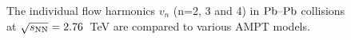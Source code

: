 \begin{figure}[h]
\begin{center}
        \caption{The individual flow harmonics $v_n$ (n=2, 3 and 4) in $\textnormal{Pb--Pb}$ collisions at $\sqrt{s_{\textnormal{NN}}}=2.76$~TeV are compared to various AMPT models.}
        \label{fig:Figure_10}
              \end{center}
\end{figure}



